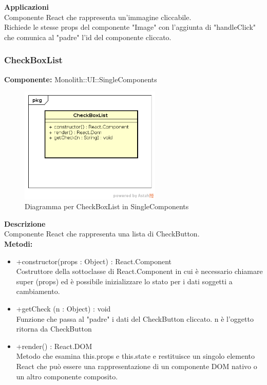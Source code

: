 \textbf{Applicazioni}\\
Componente React che rappresenta un'immagine cliccabile.\\ Richiede le stesse props del componente "Image" con l'aggiunta di "handleClick" che comunica al "padre" l'id del componente cliccato. 


\clearpage

\subsubsection{CheckBoxList}
\textbf{Componente:}  Monolith::UI::SingleComponents\\
   \FloatBarrier
   \begin{figure}[ht]
   \centering
   \includegraphics[width=0.6\textwidth]{img/single-CheckBoxList.png}
   \caption{{Diagramma per CheckBoxList in SingleComponents}}
\end{figure}
\FloatBarrier
\textbf{Descrizione}\\
Componente React che rappresenta una lista di CheckButton. \\
\textbf{Metodi:} 
\begin{itemize}
\item +constructor(props : Object) : React.Component 
\\
Costruttore della sottoclasse di React.Component in cui è necessario chiamare super (props) ed è possibile inizializzare lo stato per i dati soggetti a cambiamento.

\item +getCheck (n : Object) : void \\
Funzione che passa al "padre" i dati del CheckButton cliccato. 
n è l'oggetto ritorna da CheckButton

\item +render() : React.DOM 
\\
Metodo che esamina this.props e this.state e restituisce un singolo elemento React che può essere una rappresentazione di un componente DOM nativo o un altro componente composito.

\end{itemize}

